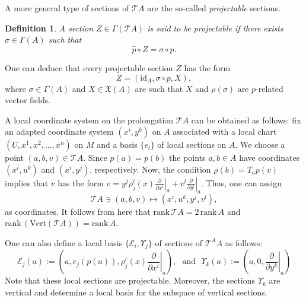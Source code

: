 \documentclass[12pt,letterpaper]{article}
\renewcommand{\hat}{\widehat}
\newtheorem{definition}[theorem]{Definition}
\numberwithin{equation}{section}
\begin{document}
A more general type of sections of $\mathcal{T}A$ are the so-called \emph{projectable} sections.

\begin{definition}
  A section $Z\in \Gamma( \mathcal{T} A )$ is said to be \emph{projectable} 
  if there exists $\sigma\in \Gamma(A)$ such that
\begin{equation}
\hat{p} \circ Z = \sigma \circ p.
\end{equation}
\end{definition}
One can deduce that every projectable section $Z$ has the form
$$ Z= (\mathrm{id}_A, \sigma\circ p , X), $$
where $\sigma \in \Gamma(A)$ and $X\in \mathfrak{X}(A)$ are such that $X$ and $\rho(\sigma)$ are $p$-related vector fields.

A local coordinate system on the prolongation $\mathcal{T} A $ can be obtained as follows:
fix an adapted coordinate system $(x^i, y^k)$ on $A$ associated with a local chart $(U,x^1,x^2,\ldots,x^n)$ on $M$ and a basis $\{ e_l \}$ of local sections on $A$. 
We choose a point $(a,b,v)\in \mathcal{T} A$. Since $p(a)=p(b)$ the points $a, b\in A$ have coordinates $(x^i,u^k) $ and $(x^i,y^j) $, respectively. Now, the condition $\rho(b)= T_a p(v) $ implies that $v$ has the form $\displaystyle v=y^j\rho^i_j(x)\left.\frac{\partial}{\partial x^i}\right|_a + v^l\left.\frac{\partial}{\partial y^l}\right|_a$. Thus, one can assign
\begin{equation}
\mathcal{T} A  \ni(a,b,v) \mapsto (x^i,u^k, y^j,  v^l),
\end{equation}
as coordinates. 
It follows from here that $\mathrm{rank}\,\mathcal{T} A  =2\,\mathrm{rank}\, A $ 
and  $\mathrm{rank}\,(\mathrm{Vert}(\mathcal{T} A )) = \mathrm{rank}\, A$.



One can also define a local basis $\{\mathcal{E}_i, \Upsilon_j\}$ of sections of $\mathcal{T}^A A$ 
as follows:
\begin{equation}\label{sectionprolon}
\mathcal{E}_j(a):= \left(a, e_j(p(a)),  \rho^i_j(x)\left.\frac{\partial}{\partial x^i}\right|_a  \right), \  \  \  \text{and}  \  \  \  \Upsilon_k(a):=\left(a, 0,\left.\frac{\partial}{\partial y^k}\right|_a\right)
\end{equation}
Note that these local sections are projectable.
Moreover, the sections $\Upsilon_k$ are vertical and determine a local basis for the subspace of vertical sections.
\end{document}
